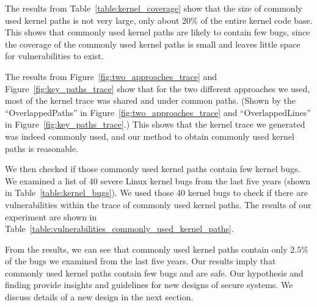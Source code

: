 The results from Table~\ref{table:kernel_coverage} show that the size of commonly used kernel paths is not very large, only about $20\%$ 
of the entire kernel code base. This shows that commonly used kernel paths are likely to contain 
few bugs, since the coverage of the commonly used kernel paths is small and leaves little space for vulnerabilities to exist. 

The results from Figure~\ref{fig:two_approaches_trace} and Figure~\ref{fig:key_paths_trace} show that for the two different approaches we used, most of the kernel trace was shared 
and under common paths. 
(Shown by the ``OverlappedPaths'' in Figure~\ref{fig:two_approaches_trace} and ``OverlappedLines'' in Figure~\ref{fig:key_paths_trace}.) 
This shows that the kernel trace we generated was indeed commonly used, 
and our method to obtain commonly used kernel paths is reasonable. 

We then checked if those commonly used kernel paths contain few kernel bugs.
We examined a list of 40 severe Linux kernel bugs from the last five years (shown in Table~\ref{table:kernel_bugs}). 
We used those 40 kernel bugs to check if there are vulnerabilities within the trace of commonly used kernel paths.
The results of our experiment are shown in Table~\ref{table:vulnerabilities_commonly_used_kernel_paths}.  

From the results, we can see that commonly used kernel paths contain only $2.5\%$ of the bugs we examined 
from the last five years.  
Our results imply that commonly used kernel paths
contain few bugs and are safe. 
Our hypothesis and finding provide insights and guidelines for new designs of secure systems. We discuss details of 
a new design in the next section. 
